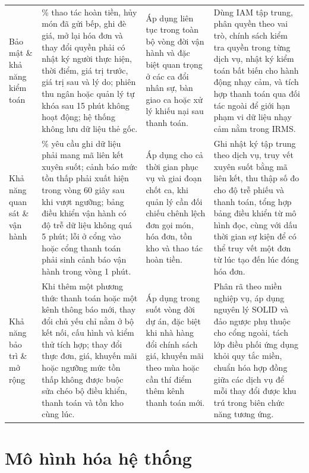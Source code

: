 \documentclass[11pt,a4paper]{article}
\begin{document}
\begin{longtable}{
  >{\bfseries\raggedright\arraybackslash}p{2.8cm}
  >{\raggedright\arraybackslash}p{4.4cm}
  >{\raggedright\arraybackslash}p{3.0cm}
  >{\raggedright\arraybackslash}p{4.2cm}
}
Bảo mật \& khả năng kiểm toán & 100\% thao tác hoàn tiền, hủy món đã gửi bếp, ghi đè giá, mở lại hóa đơn và thay đổi quyền phải có nhật ký người thực hiện, thời điểm, giá trị trước, giá trị sau và lý do; phiên thu ngân hoặc quản lý tự khóa sau 15 phút không hoạt động; hệ thống không lưu dữ liệu thẻ gốc. & Áp dụng liên tục trong toàn bộ vòng đời vận hành và đặc biệt quan trọng ở các ca đổi nhân sự, bàn giao ca hoặc xử lý khiếu nại sau thanh toán. & Dùng \textsf{IAM} tập trung, phân quyền theo vai trò, chính sách kiểm tra quyền trong từng dịch vụ, nhật ký kiểm toán bất biến cho hành động nhạy cảm, và tích hợp thanh toán qua đối tác ngoài để giới hạn phạm vi dữ liệu nhạy cảm nằm trong IRMS. \\
Khả năng quan sát \& vận hành & 100\% yêu cầu ghi dữ liệu phải mang mã liên kết xuyên suốt; cảnh báo mức tồn thấp phải xuất hiện trong vòng 60 giây sau khi vượt ngưỡng; bảng điều khiển vận hành có độ trễ dữ liệu không quá 5 phút; lỗi ở cổng vào hoặc cổng thanh toán phải sinh cảnh báo vận hành trong vòng 1 phút. & Áp dụng cho cả thời gian phục vụ và giai đoạn chốt ca, khi quản lý cần đối chiếu chênh lệch đơn gọi món, hóa đơn, tồn kho và thao tác hoàn tiền. & Ghi nhật ký tập trung theo dịch vụ, truy vết xuyên suốt bằng mã liên kết, thu thập số đo cho độ trễ phiếu và thanh toán, tổng hợp bảng điều khiển từ mô hình đọc, cùng với dấu thời gian sự kiện để có thể truy vết một đơn từ lúc tạo đến lúc đóng hóa đơn. \\
Khả năng bảo trì \& mở rộng & Khi thêm một phương thức thanh toán hoặc một kênh thông báo mới, thay đổi chủ yếu chỉ nằm ở bộ kết nối, cấu hình và kiểm thử tích hợp; thay đổi thực đơn, giá, khuyến mãi hoặc ngưỡng mức tồn thấp không được buộc sửa chéo bộ điều khiển, thanh toán và tồn kho cùng lúc. & Áp dụng trong suốt vòng đời dự án, đặc biệt khi nhà hàng đổi chính sách giá, khuyến mãi theo mùa hoặc cần thí điểm thêm kênh thanh toán mới. & Phân rã theo miền nghiệp vụ, áp dụng nguyên lý SOLID và đảo ngược phụ thuộc cho cổng ngoài, tách lớp điều phối ứng dụng khỏi quy tắc miền, chuẩn hóa hợp đồng giữa các dịch vụ để mỗi thay đổi được khu trú trong biên chức năng tương ứng. \\
\bottomrule
\end{longtable}
\normalsize
\section{Mô hình hóa hệ thống}
\end{document}
